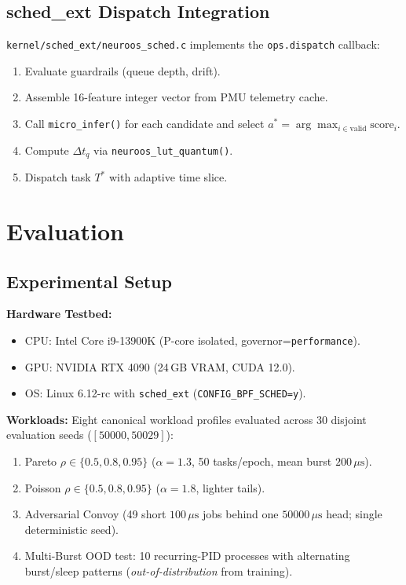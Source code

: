 \subsection{sched\_ext Dispatch Integration}
\label{subsec:schedext}

\texttt{kernel/sched\_ext/neuroos\_sched.c} implements the \texttt{ops.dispatch}
callback:
\begin{enumerate}
  \item Evaluate guardrails (queue depth, drift).
  \item Assemble 16-feature integer vector from PMU telemetry cache.
  \item Call \texttt{micro\_infer()} for each candidate and select
    $a^* = \arg\max_{i \in \text{valid}} \text{score}_i$.
  \item Compute $\Delta t_q$ via \texttt{neuroos\_lut\_quantum()}.
  \item Dispatch task $T^*$ with adaptive time slice.
\end{enumerate}

\section{Evaluation}
\label{sec:eval}

\subsection{Experimental Setup}
\label{subsec:setup}

\textbf{Hardware Testbed:}
\begin{itemize}
  \item CPU: Intel Core i9-13900K (P-core isolated, governor=\texttt{performance}).
  \item GPU: NVIDIA RTX 4090 (24\,GB VRAM, CUDA 12.0).
  \item OS: Linux 6.12-rc with \texttt{sched\_ext} (\texttt{CONFIG\_BPF\_SCHED=y}).
\end{itemize}

\textbf{Workloads:} Eight canonical workload profiles evaluated across 30
disjoint evaluation seeds ($[50000, 50029]$):
\begin{enumerate}
  \item Pareto $\rho \in \{0.5, 0.8, 0.95\}$ ($\alpha = 1.3$, 50 tasks/epoch,
    mean burst $200\,\mu\text{s}$).
  \item Poisson $\rho \in \{0.5, 0.8, 0.95\}$ ($\alpha = 1.8$, lighter tails).
  \item Adversarial Convoy (49 short $100\,\mu\text{s}$ jobs behind one
    $50000\,\mu\text{s}$ head; single deterministic seed).
  \item Multi-Burst OOD test: 10 recurring-PID processes with
    alternating burst/sleep patterns (\emph{out-of-distribution} from training).
\end{enumerate}

